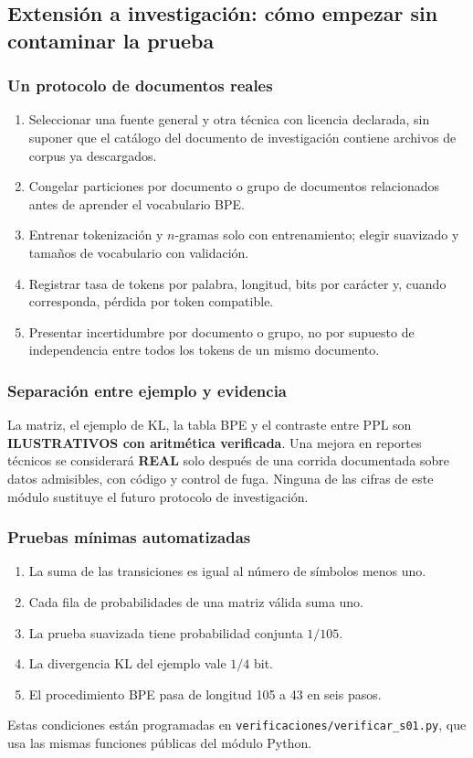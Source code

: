 \subsection{Extensión a investigación: cómo empezar sin contaminar la prueba}
\subsubsection{Un protocolo de documentos reales}
\begin{enumerate}
\item Seleccionar una fuente general y otra técnica con licencia declarada,
sin suponer que el catálogo del documento de investigación contiene
archivos de corpus ya descargados.
\item Congelar particiones por documento o grupo de documentos relacionados
antes de aprender el vocabulario BPE.
\item Entrenar tokenización y $n$-gramas solo con entrenamiento;
elegir suavizado y tamaños de vocabulario con validación.
\item Registrar tasa de tokens por palabra, longitud, bits por carácter
y, cuando corresponda, pérdida por token compatible.
\item Presentar incertidumbre por documento o grupo, no por supuesto de
independencia entre todos los tokens de un mismo documento.
\end{enumerate}
\subsubsection{Separación entre ejemplo y evidencia}
La matriz, el ejemplo de KL, la tabla BPE y el contraste entre PPL
son \textbf{ILUSTRATIVOS con aritmética verificada}. Una mejora en
reportes técnicos se considerará \textbf{REAL} solo después de una
corrida documentada sobre datos admisibles, con código y control de
fuga. Ninguna de las cifras de este módulo sustituye el futuro
protocolo de investigación.
\subsubsection{Pruebas mínimas automatizadas}
\begin{enumerate}
\item La suma de las transiciones es igual al número de símbolos
menos uno.
\item Cada fila de probabilidades de una matriz válida suma uno.
\item La prueba suavizada tiene probabilidad conjunta $1/105$.
\item La divergencia KL del ejemplo vale $1/4$ bit.
\item El procedimiento BPE pasa de longitud 105 a 43 en seis pasos.
\end{enumerate}
Estas condiciones están programadas en
\nolinkurl{verificaciones/verificar_s01.py}, que usa las mismas
funciones públicas del módulo Python.

